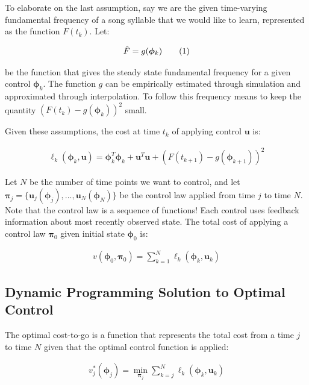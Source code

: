 \documentclass{article} %
\newcommand\numberthis{\addtocounter{equation}{1}\tag{\theequation}}
\begin{document}
To elaborate on the last assumption, say we are the given time-varying fundamental frequency
of a song syllable that we would like to learn, represented as the function $F(t_k)$. Let:

\begin{align*}
\hat{F} = g(\bm{\phi}_k) \numberthis \label{eq_ff}
\end{align*}

be the function that gives the steady state fundamental
frequency for a given control $\bm{\phi}_k$. The function $g$ can be empirically
estimated through simulation and approximated through interpolation. To follow this
frequency means to keep the quantity $\left( F(t_k) - g(\bm{\phi}_k) \right) ^2$ small.

Given these assumptions, the cost at time $t_k$ of applying control $\bm{u}$ is:

\begin{align*}
\ell_k \left( \bm{\phi}_{k}, \bm{u} \right) = \bm{\phi}_{k}^T \bm{\phi}_{k} +
							\bm{u}^T \bm{u} +
							\left( F(t_{k+1}) - g(\bm{\phi}_{k+1}) \right) ^2
\end{align*}

Let $N$ be the number of time points we want to control, and let
$\bm{\pi}_j=\{ \bm{u}_j(\bm{\phi}_{j}), ..., \bm{u}_N(\bm{\phi}_{N}) \}$ be the control
law applied from time $j$ to time $N$. Note that the control law is a sequence of
functions! Each control uses feedback information about most recently observed state.
The total cost of applying a control law $\bm{\pi}_0$ given initial state
$\bm{\phi}_0$ is:

\begin{align*}
v\left( \bm{\phi}_0, \bm{\pi}_0 \right) = \sum_{k=1}^N \ell_k \left( \bm{\phi}_{k}, \bm{u}_k \right)
\end{align*}


\subsection{Dynamic Programming Solution to Optimal Control}

The optimal cost-to-go is a function that represents the total cost from a time
$j$ to time $N$ given that the optimal control function is applied:

\begin{align*}
v^*_j \left( \bm{\phi}_j \right) = \min_{\bm{\pi}_j} \sum_{k=j}^N \ell_k \left( \bm{\phi}_k, \bm{u}_k \right)
\end{align*}
\end{document}
